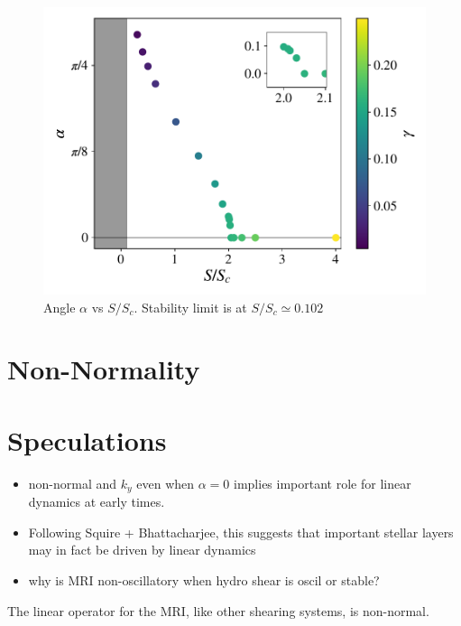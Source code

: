 \documentclass[aps,prl,reprint,superscriptaddress]{revtex4-1}
\newcommand{\SSC}{S/S_{c}}
\begin{document}
\begin{figure}[h!]
  \includegraphics[width=\columnwidth]{alpha_vs_ssc_grid.pdf}
  \caption{Angle $\alpha$ vs $\SSC$. Stability limit is at $\SSC \simeq 0.102$}
  \label{fig:alpha}
\end{figure}

\section{Non-Normality}
\label{sec:non-normality}

\section{Speculations}
\label{sec:speculations}

\begin{itemize}
\item non-normal and $k_y$ even when $\alpha = 0$ implies important role for linear dynamics at early times. 
\item Following Squire + Bhattacharjee, this suggests that important stellar layers may in fact be driven by linear dynamics
\item why is MRI non-oscillatory when hydro shear is oscil or stable?
\end{itemize}
The linear operator for the MRI, like other shearing systems, is non-normal. 
\end{document}
